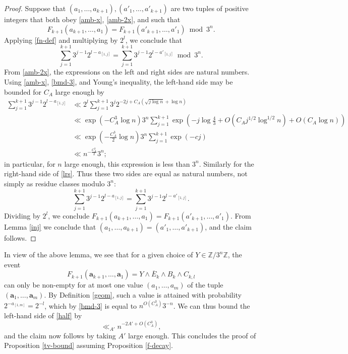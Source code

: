 \documentclass[12pt,a4paper,reqno]{amsart}
\numberwithin{equation}{section}
\theoremstyle{plain}
\theoremstyle{definition}
\newcommand\Z{\mathbb{Z}}
\renewcommand\a{\mathbf{a}}
\renewcommand{\mod}{\bmod}
\begin{document}
\begin{proof}  Suppose that $(a_1,\dots,a_{k+1}), (a'_1,\dots,a'_{k+1})$ are two tuples of positive integers that both obey \eqref{amb-x}, \eqref{amb-2x}, and such that
$$ F_{k+1}(a_{k+1},\dots,a_1) = F_{k+1}(a'_{k+1},\dots,a'_1) \mod 3^n.$$
Applying \eqref{fn-def} and multiplying by $2^l$, we conclude that
\begin{equation}\label{lrs}
 \sum_{j=1}^{k+1} 3^{j-1} 2^{l - a_{[1,j]}} = \sum_{j=1}^{k+1} 3^{j-1} 2^{l - a'_{[1,j]}} \mod 3^n.
\end{equation}
From \eqref{amb-2x}, the expressions on the left and right sides are natural numbers.  Using \eqref{amb-x}, \eqref{bmd-3}, and Young's inequality, the left-hand side may be bounded for $C_A$ large enough by
\begin{align*}
 \sum_{j=1}^{k+1} 3^{j-1} 2^{l - a_{[1,j]}} 
&\ll 2^l \sum_{j=1}^{k+1} 3^{j} 2^{- 2j + C_A (\sqrt{j \log n} + \log n)} \\
&\ll \exp( - C_A^3 \log n ) 3^n \sum_{j=1}^{k+1} \exp\left( - j \log \frac{4}{3} + O( C_A j^{1/2} \log^{1/2} n ) + O( C_A \log n ) \right) \\
&\ll \exp\left( - \frac{C_A^3}{2} \log n \right) 3^n \sum_{j=1}^{k+1} \exp( - c j ) \\
&\ll n^{- \frac{C_A^3}{2}} 3^n;
\end{align*}
in particular, for $n$ large enough, this expression is less than $3^n$.  Similarly for the right-hand side of \eqref{lrs}.  Thus these two sides are equal as natural numbers, not simply as residue classes modulo $3^n$:
\begin{equation}\label{span}
 \sum_{j=1}^{k+1} 3^{j-1} 2^{l-a_{[1,j]}} = \sum_{j=1}^{k+1} 3^{j-1} 2^{l-a'_{[1,j]}}.
\end{equation}
Dividing by $2^l$, we conclude $F_{k+1}(a_{k+1},\dots,a_1) = F_{k+1}(a'_{k+1},\dots,a'_1)$.  From Lemma \ref{inj} we conclude that $(a_1,\dots,a_{k+1}) = (a'_1,\dots,a'_{k+1})$, and the claim follows.
\end{proof}

In view of the above lemma, we see that for a given choice of $Y \in \Z/3^n\Z$, the event
$$ F_{k+1}(\a_{k+1},\dots,\a_1) = Y \wedge \overline{E}_k \wedge B_k \wedge C_{k,l} $$
can only be non-empty for at most one value $(a_1,\dots,a_{m})$ of the tuple $(\a_1,\dots,\a_{m})$.  By Definition \ref{geom}, such a value is attained with probability $2^{-a_{[1,m]}} = 2^{-l}$, which by \eqref{bmd-3} is equal to $n^{O(C_A^3)} 3^{-n}$.  We can thus bound the left-hand side of \eqref{half} by
$$ \ll_{A'} n^{-2 A' + O( C_A^3 ) },$$
and the claim now follows by taking $A'$ large enough.  This concludes the proof of Proposition \ref{tv-bound} assuming Proposition \ref{f-decay}.
\end{document}
